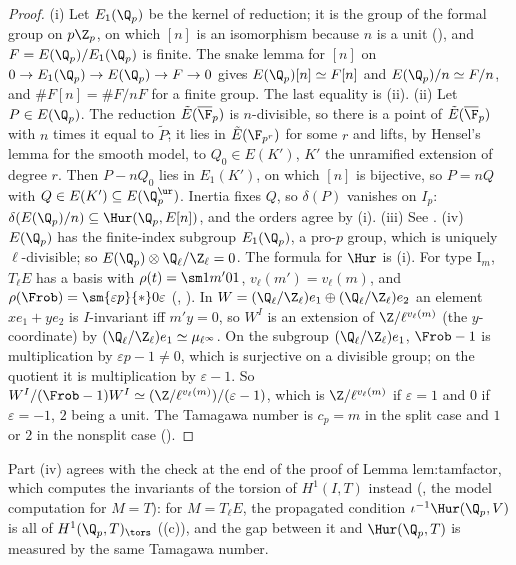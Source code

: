 \begin{proof}
(i) Let $E_1(\Q_p)$ be the kernel of reduction; it is the group of the formal group on $p\Z_p$, on which $[n]$ is an isomorphism because $n$ is a unit (),
and $F=E(\Q_p)/E_1(\Q_p)$ is finite. The snake lemma for $[n]$ on $0\to E_1(\Q_p)\to E(\Q_p)\to F\to0$ gives $E(\Q_p)[n]\simeq F[n]$ and $E(\Q_p)/n\simeq F/n$, and
$\#F[n]=\#F/nF$ for a finite group. The last equality is (ii).
(ii) Let $P\in E(\Q_p)$. The reduction $\tilde E(\overline\F_p)$ is $n$-divisible, so there is a point of $\tilde E(\overline\F_p)$ with $n$ times it equal to $\tilde P$; it lies in
$\tilde E(\F_{p^r})$ for some $r$ and lifts, by Hensel's lemma for the smooth model, to $Q_0\in E(K')$, $K'$ the unramified extension of degree $r$. Then $P-nQ_0$ lies in
$E_1(K')$, on which $[n]$ is bijective, so $P=nQ$ with $Q\in E(K')\subseteq E(\Q_p^{\ur})$. Inertia fixes $Q$, so $\delta(P)$ vanishes on $I_p$: $\delta(E(\Q_p)/n)\subseteq\Hur(\Q_p,E[n])$,
and the orders agree by (i). (iii) See \cite[Chapter I, Section 3]{MilneADT}.
(iv) $E(\Q_p)$ has the finite-index subgroup $E_1(\Q_p)$, a pro-$p$ group, which is uniquely $\ell$-divisible; so $E(\Q_p)\otimes\Q_\ell/\Z_\ell=0$. The formula for $\Hur$ is
(i). For type $\mathrm I_m$, $T_\ell E$ has a basis with $\rho(t)=\sm1{m'}01$, $v_\ell(m')=v_\ell(m)$, and $\rho(\Frob)=\sm{\varepsilon p}{*}0\varepsilon$
(, ). In $W=(\Q_\ell/\Z_\ell)e_1\oplus(\Q_\ell/\Z_\ell)e_2$ an element $xe_1+ye_2$ is $I$-invariant iff $m'y=0$, so $W^I$ is an extension of
$\Z/\ell^{v_\ell(m)}$ (the $y$-coordinate) by $(\Q_\ell/\Z_\ell)e_1\simeq\mu_{\ell^\infty}$. On the subgroup $(\Q_\ell/\Z_\ell)e_1$, $\Frob-1$ is multiplication by $\varepsilon p-1\ne0$, which is
surjective on a divisible group; on the quotient it is multiplication by $\varepsilon-1$. So $W^I/(\Frob-1)W^I\simeq(\Z/\ell^{v_\ell(m)})/(\varepsilon-1)$, which is
$\Z/\ell^{v_\ell(m)}$ if $\varepsilon=1$ and $0$ if $\varepsilon=-1$, $2$ being a unit. The Tamagawa number is $c_p=m$ in the split case and $1$ or $2$ in the nonsplit case
().
\end{proof}

\noindent Part (iv) agrees with the check at the end of the proof of Lemma lem:tamfactor, which computes the invariants of the torsion of $H^1(I,T)$ instead
(, the model computation for $M=T$): for $M=T_\ell E$, the propagated condition $\iota^{-1}\Hur(\Q_p,V)$ is all of $H^1(\Q_p,T)_{\tors}$ ((c)),
and the gap between it and $\Hur(\Q_p,T)$ is measured by the same Tamagawa number.

